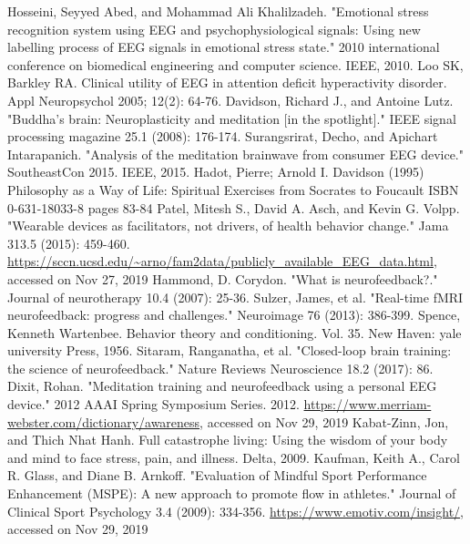 \documentclass{llncs} %
\begin{document}
\begin{thebibliography}{[MT1]}
    Hosseini, Seyyed Abed, and Mohammad Ali Khalilzadeh. "Emotional stress recognition system using EEG and psychophysiological signals: Using new labelling process of EEG signals in emotional stress state." 2010 international conference on biomedical engineering and computer science. IEEE, 2010.
    Loo SK, Barkley RA. Clinical utility of EEG in attention deficit hyperactivity disorder. Appl Neuropsychol 2005; 12(2): 64-76.
    Davidson, Richard J., and Antoine Lutz. "Buddha's brain: Neuroplasticity and meditation [in the spotlight]." IEEE signal processing magazine 25.1 (2008): 176-174.
    Surangsrirat, Decho, and Apichart Intarapanich. "Analysis of the meditation brainwave from consumer EEG device." SoutheastCon 2015. IEEE, 2015.
    Hadot, Pierre; Arnold I. Davidson (1995) Philosophy as a Way of Life: Spiritual Exercises from Socrates to Foucault ISBN 0-631-18033-8 pages 83-84
    Patel, Mitesh S., David A. Asch, and Kevin G. Volpp. "Wearable devices as facilitators, not drivers, of health behavior change." Jama 313.5 (2015): 459-460.
    \url{https://sccn.ucsd.edu/~arno/fam2data/publicly_available_EEG_data.html}, accessed on Nov 27, 2019
    Hammond, D. Corydon. "What is neurofeedback?." Journal of neurotherapy 10.4 (2007): 25-36.
    Sulzer, James, et al. "Real-time fMRI neurofeedback: progress and challenges." Neuroimage 76 (2013): 386-399.
    Spence, Kenneth Wartenbee. Behavior theory and conditioning. Vol. 35. New Haven: yale university Press, 1956.
    Sitaram, Ranganatha, et al. "Closed-loop brain training: the science of neurofeedback." Nature Reviews Neuroscience 18.2 (2017): 86.
    Dixit, Rohan. "Meditation training and neurofeedback using a personal EEG device." 2012 AAAI Spring Symposium Series. 2012.
    \url{https://www.merriam-webster.com/dictionary/awareness}, accessed on Nov 29, 2019
    Kabat-Zinn, Jon, and Thich Nhat Hanh. Full catastrophe living: Using the wisdom of your body and mind to face stress, pain, and illness. Delta, 2009.
    Kaufman, Keith A., Carol R. Glass, and Diane B. Arnkoff. "Evaluation of Mindful Sport Performance Enhancement (MSPE): A new approach to promote flow in athletes." Journal of Clinical Sport Psychology 3.4 (2009): 334-356.
    \url{https://www.emotiv.com/insight/}, accessed on Nov 29, 2019

\end{thebibliography}
\end{document}
